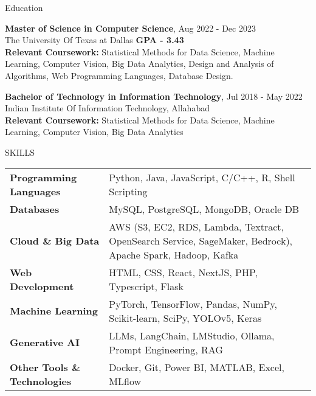 \documentclass{resume} %
\begin{document}

\begin{rSection}{Education}

{\bf Master of Science in Computer Science},  \hfill {Aug 2022 - Dec 2023}\\
The University Of Texas at Dallas {\hfill{\bf GPA - 3.43}} \\
\textbf{Relevant Coursework:} Statistical Methods for Data Science, Machine Learning, Computer Vision, Big Data Analytics, Design and Analysis of Algorithms, Web Programming Languages, Database Design.

{\bf Bachelor of Technology in Information Technology}, \hfill {Jul 2018 - May 2022} \\
Indian Institute Of Information Technology, Allahabad   \\
\textbf{Relevant Coursework:} Statistical Methods for Data Science, Machine Learning, Computer Vision, Big Data Analytics


\end{rSection}

\begin{rSection}{SKILLS}

\noindent %
\begin{tabularx}{\textwidth}{ @{} >{\bfseries}l @{\hspace{3ex}} X } %
Programming Languages & Python, Java, JavaScript, C/C++, R, Shell Scripting \\
Databases & MySQL, PostgreSQL, MongoDB, Oracle DB \\
Cloud \& Big Data & AWS (S3, EC2, RDS, Lambda, Textract, OpenSearch Service, SageMaker, Bedrock), Apache Spark, Hadoop, Kafka \\
Web Development & HTML, CSS, React, NextJS, PHP, Typescript, Flask \\
Machine Learning & PyTorch, TensorFlow, Pandas, NumPy, Scikit-learn, SciPy, YOLOv5, Keras \\
Generative AI & LLMs, LangChain, LMStudio, Ollama, Prompt Engineering, RAG \\
Other Tools \& Technologies & Docker, Git, Power BI, MATLAB, Excel, MLflow \\
\end{tabularx}
\end{rSection}
\end{document}
